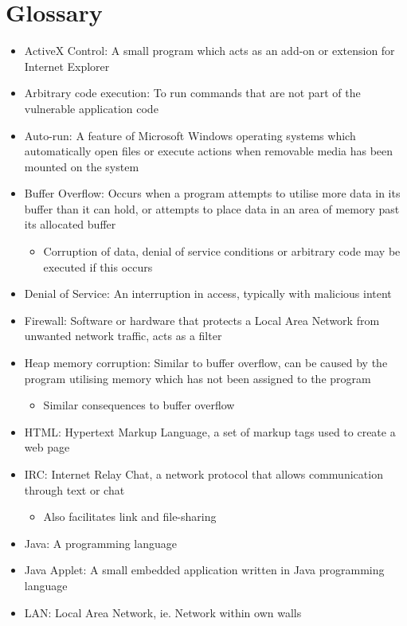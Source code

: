 \section{Glossary}

\begin{itemize}
\item ActiveX Control: A small program which acts as an add-on or extension for Internet Explorer
\item Arbitrary code execution: To run commands that are not part of the vulnerable application code
\item Auto-run: A feature of Microsoft Windows operating systems which automatically open files or execute actions when removable media has been mounted on the system
\item Buffer Overflow: Occurs when a program attempts to utilise more data in its buffer than it can hold, or attempts to place data in an area of memory  past its allocated buffer
	\begin{itemize}
	\item Corruption of data, denial of service conditions or arbitrary code may be executed if this occurs	
	\end{itemize}
\item Denial of Service: An interruption in access, typically with malicious intent
\item Firewall: Software or hardware that protects a Local Area Network from unwanted network traffic, acts as a filter
\item Heap memory corruption: Similar to buffer overflow, can be caused by the program utilising memory which has not been assigned to the program
	\begin{itemize}
	\item Similar consequences to buffer overflow
	\end{itemize}
\item HTML: Hypertext Markup Language, a set of markup tags used to create a web page
\item IRC: Internet Relay Chat, a network protocol that allows communication through text or chat
	\begin{itemize}
	\item Also facilitates link and file-sharing
	\end{itemize}
\item Java: A programming language
\item Java Applet: A small embedded application written in Java programming language
\item LAN: Local Area Network, ie. Network within own walls

\end{itemize}
